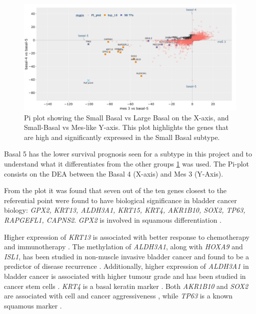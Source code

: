 \begin{figure}[!htb]   
    \centering
    \includegraphics[width=1.0\textwidth,keepaspectratio]{Sections/Network_I/Resources/selective_pruning/pi_gsea/pi_smallBasal.png}
      \caption{Pi plot showing the Small Basal vs Large Basal on the X-axis, and Small-Basal vs Mes-like Y-axis. This plot highlights the genes that are high and significantly expressed in the Small Basal subtype. }
    \label{fig:N_I:pi_smallBasal_comp}
\end{figure}

Basal 5 has the lower survival prognosis seen for a subtype in this project and to understand what it differentiates from the other groups \cref{fig:N_I:pi_smallBasal_comp} was used. The Pi-plot consists on the DEA between the Basal 4 (X-axis) and Mes 3 (Y-Axis).

From the plot it was found that seven out of the ten genes closest to the referential point were found to have biological significance in bladder cancer biology: \textit{GPX2, KRT13, ALDH3A1, KRT15, KRT4, AKR1B10, SOX2, TP63, RAPGEFL1, CAPNS2}. \textit{GPX2} is involved in squamous differentiation \citet{Naiki2018-fp}. 

Higher expression of \textit{KRT13} is associated with better response to chemotherapy and immunotherapy \citep{Yu2023-db}. The methylation of \textit{ALDH3A1}, along with \textit{HOXA9} and \textit{ISL1}, has been studied in non-muscle invasive bladder cancer and found to be a predictor of disease recurrence \citep{McLean2023-qk}. Additionally, higher expression of \textit{ALDH3A1} in bladder cancer is associated with higher tumour grade and has been studied in cancer stem cells \citet{Kim2013-th}. \textit{KRT4} is a basal keratin marker \citep{Marzouka2018-ge}. Both \textit{AKR1B10} and \textit{SOX2} are associated with cell and cancer aggressiveness \citep{Huang2021-bn, Chiu2020-xh}, while \textit{TP63} is a known squamous marker \citep{Robertson2017-mg}. 

